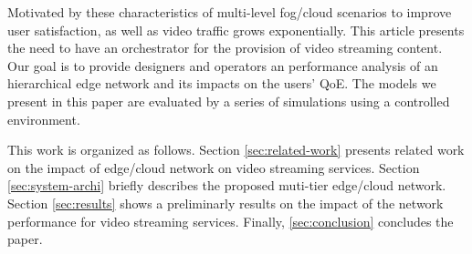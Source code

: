 Motivated by these characteristics of multi-level fog/cloud scenarios to improve user satisfaction, as well as video traffic grows exponentially. This article presents the need to have an orchestrator for the provision of video streaming content.
Our goal is to provide designers and operators an performance analysis  of an hierarchical edge network and its impacts on the users' QoE. The models we present in this paper are evaluated by a series of simulations using a controlled environment.

This work is organized as follows.
Section \ref{sec:related-work} presents related work on the impact of edge/cloud network on video streaming services.
Section \ref{sec:system-archi} briefly describes the proposed muti-tier edge/cloud network.
Section \ref{sec:results} shows a preliminarly results on the impact of the network performance for video streaming services.
Finally, \ref{sec:conclusion} concludes the paper.